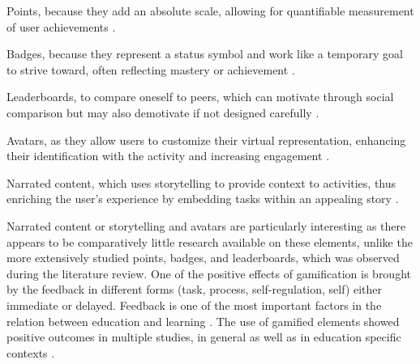 \begin{APAitemize}
    \item Points, because they add an absolute scale, allowing for quantifiable measurement of user achievements \parencite{hamariDoesGamificationWork2014}.
    \item Badges, because they represent a status symbol and work like a temporary goal to strive toward, often reflecting mastery or achievement \parencite{gonzalezGamificationIntelligentTutoring2014}.
    \item Leaderboards, to compare oneself to peers, which can motivate through social comparison but may also demotivate if not designed carefully \parencite{hamariDoesGamificationWork2014, almeidaSystematicMappingNegative2021}.
    \item Avatars, as they allow users to customize their virtual representation, enhancing their identification with the activity and increasing engagement \parencite{gonzalezGamificationIntelligentTutoring2014}.
    \item Narrated content, which uses storytelling to provide context to activities, thus enriching the user's experience by embedding tasks within an appealing story \parencite{gonzalezGamificationIntelligentTutoring2014}.
\end{APAitemize}
Narrated content or storytelling and avatars are particularly interesting as there appears to be comparatively little research available on these elements, unlike the more extensively studied points, badges, and leaderboards, which was observed during the literature review.
One of the positive effects of gamification is brought by the feedback in different forms (task, process, self-regulation, self) either immediate or delayed.
Feedback is one of the most important factors in the relation between education and learning \parencite{sailerGamificationLearningMetaanalysis2020}.
The use of gamified elements showed positive outcomes in multiple studies, in general \parencite{hamariDoesGamificationWork2014} as well as in education specific contexts \parencite{sailerGamificationLearningMetaanalysis2020}.


